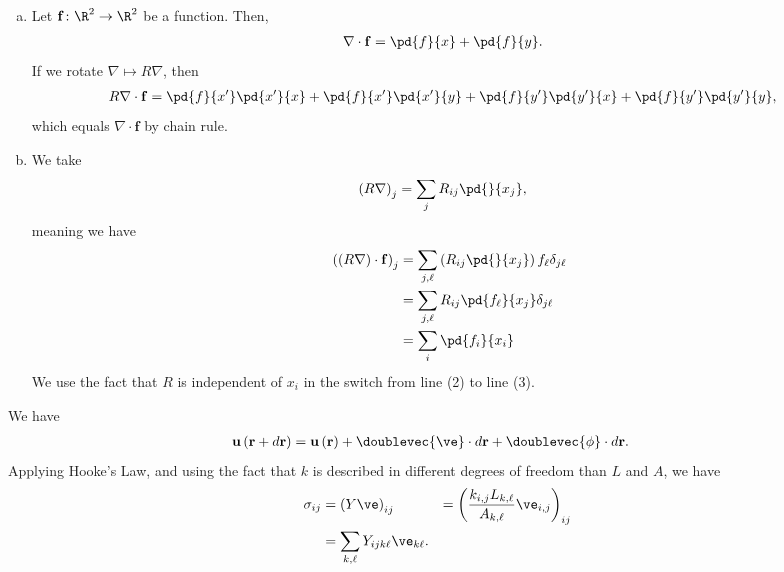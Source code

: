 \documentclass[10pt]{mypackage}
\begin{document}
\begin{solution}[29.12]\hfill
  \begin{enumerate}[(a)]
    \item Let $\mathbf{f}\colon \R^2\rightarrow \R^2$ be a function. Then,
      \begin{align*}
        \nabla\cdot \mathbf{f} &= \pd{f}{x} + \pd{f}{y}.
      \end{align*}
      If we rotate $\nabla\mapsto R\nabla$, then
      \begin{align*}
        R\nabla \cdot \mathbf{f} &= \pd{f}{x'}\pd{x'}{x} + \pd{f}{x'}\pd{x'}{y} + \pd{f}{y'}\pd{y'}{x} + \pd{f}{y'}\pd{y'}{y},
      \end{align*}
      which equals $\nabla\cdot \mathbf{f}$ by chain rule.
    \item We take
      \begin{align*}
        \left( R\nabla \right)_j &= \sum_{j}R_{ij}\pd{}{x_j},
      \end{align*}
      meaning we have
      \begin{align*}
        \left( \left( R\nabla \right)\cdot \mathbf{f} \right)_{j} &= \sum_{j,\ell}\left( R_{ij}\pd{}{x_j} \right)f_{\ell}\delta_{j\ell}\\
                                               &= \sum_{j,\ell}R_{ij} \pd{f_{\ell}}{x_j}\delta_{j\ell}\\
                                               &= \sum_{i} \pd{f_{i}}{x_i}
      \end{align*}
      We use the fact that $R$ is independent of $x_i$ in the switch from line (2) to line (3).
  \end{enumerate}
\end{solution}
\begin{solution}[29.14]
  We have
  \begin{align*}
    \mathbf{u}\left( \mathbf{r} + d\mathbf{r} \right) &= \mathbf{u}\left( \mathbf{r} \right) + \doublevec{\ve}\cdot d\mathbf{r} + \doublevec{\phi}\cdot d\mathbf{r}.
  \end{align*}
  Applying Hooke's Law, and using the fact that $k$ is described in different degrees of freedom than $L$ and $A$, we have
  \begin{align*}
    \sigma_{ij} &= \left( Y\ve \right)_{ij}
                &= \left( \frac{k_{i,j}L_{k,\ell}}{A_{k,\ell}}\ve_{i,j} \right)_{ij}\\
                &= \sum_{k,\ell}Y_{ijk\ell}\ve_{k\ell}.
  \end{align*}
\end{solution}
\end{document}
